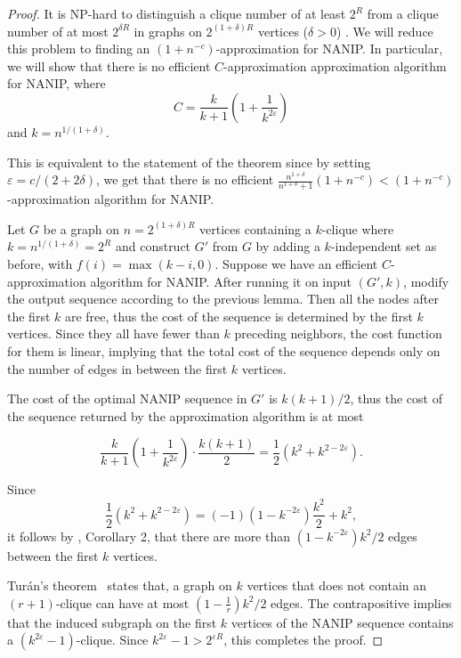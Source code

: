 \documentclass[english]{llncs}
\def\eps{\varepsilon}
\begin{document}
\begin{proof}
It is NP-hard to distinguish a clique number of at least $2^R$ from a clique
number of at most $2^{\delta R}$ in graphs on $2^{(1+\delta)R}$ vertices ($\delta>0$)
\cite{Zuckerman06}.  We will reduce this problem to finding an
$(1+n^{-c})$-approximation for NANIP.  In particular, we will show that there
is no efficient $C$-approximation approximation algorithm for NANIP, where $$ C
= \frac{k}{k+1} \left ( 1 + \frac{1}{k^{2\varepsilon}} \right ) $$ and
$k=n^{1/(1+\delta)}$.

This is equivalent to the statement of the theorem since by setting
$\eps=c/(2+2\delta)$, we get that there is no efficient
$\frac{n^{1+\delta}}{n^{1+\delta}+1}(1+n^{-c})<(1+n^{-c})$-approximation
algorithm for NANIP.

Let $G$ be a graph on $n=2^{(1+\delta)R}$ vertices containing a $k$-clique
where $k=n^{1/(1+\delta)}=2^R$ and construct $G'$ from $G$ by adding a
$k$-independent set as before, with $f(i)=\max(k-i, 0)$. Suppose we have an
efficient $C$-approximation algorithm for NANIP. After running it on input
$(G', k)$, modify the output sequence according to the previous lemma. Then all
the nodes after the first $k$ are free, thus the cost of the sequence is
determined by the first $k$ vertices. Since they all have fewer than $k$
preceding neighbors, the cost function for them is linear, implying that the
total cost of the sequence depends only on the number of edges in between the
first $k$ vertices.

The cost of the optimal NANIP sequence in $G'$ is $k(k+1)/2$, thus the cost of
the sequence returned by the approximation algorithm is at most

$$ \frac{k}{k+1}\left(1+\frac{1}{k^{2\eps}}\right)\cdot \frac{k(k+1)}{2} =
\frac12(k^2+k^{2-2\eps}).$$

Since $$\frac12(k^2+k^{2-2\eps})=(-1)(1-k^{-2\eps})\frac{k^2}{2}+k^2,$$ it
follows by \cite{Gutfraind14}, Corollary 2, that there are more than
$(1-k^{-2\eps})k^2/2$ edges between the first $k$ vertices.

Tur\'an's theorem~\cite{Turan1941} states that, a graph on $k$ vertices that
does not contain an $(r+1)$-clique can have at most $(1-\frac1r)k^2/2$ edges.
The contrapositive implies that the induced subgraph on the first $k$ vertices
of the NANIP sequence contains a $(k^{2\eps}-1)$-clique.  Since $k^{2\eps}-1>
2^{\eps R}$, this completes the proof.

\end{proof}
\end{document}
